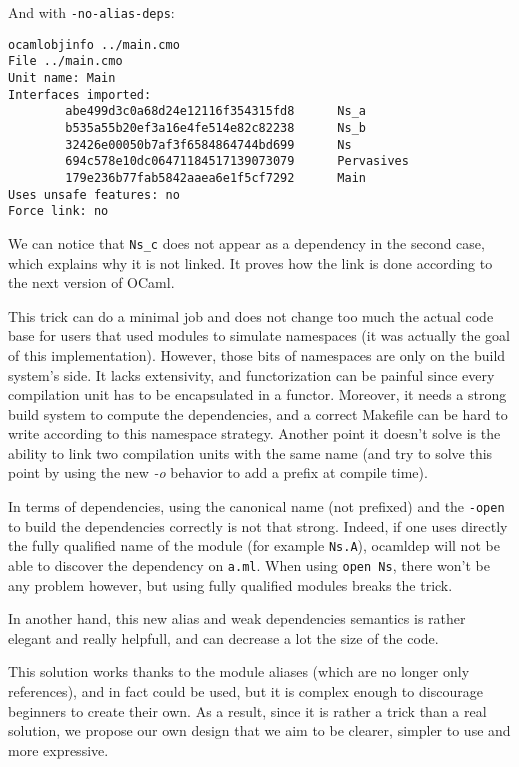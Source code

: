 \documentclass[11pt,a4paper]{article}
\begin{document}
And with \texttt{-no-alias-deps}:

\begin{verbatim}
ocamlobjinfo ../main.cmo
File ../main.cmo
Unit name: Main
Interfaces imported:
        abe499d3c0a68d24e12116f354315fd8      Ns_a
        b535a55b20ef3a16e4fe514e82c82238      Ns_b
        32426e00050b7af3f6584864744bd699      Ns
        694c578e10dc06471184517139073079      Pervasives
        179e236b77fab5842aaea6e1f5cf7292      Main
Uses unsafe features: no
Force link: no
\end{verbatim}

We can notice that \texttt{Ns\_c} does not appear as a dependency in the second
case, which explains why it is not linked. It proves how the link is done
according to the next version of OCaml.

This trick can do a minimal job and does not change too much the actual code
base for users that used modules to simulate namespaces (it was actually the
goal of this implementation). However, those bits of namespaces are only on the
build system's side. It lacks extensivity, and functorization can be painful
since every compilation unit has to be encapsulated in a functor. Moreover, it
needs a strong build system to compute the dependencies, and a correct Makefile
can be hard to write according to this namespace strategy. Another point it
doesn't solve is the ability to link two compilation units with the same name
(and try to solve this point by using the new \emph{-o} behavior to add a prefix
at compile time).

In terms of dependencies, using the canonical name (not prefixed) and the
\texttt{-open} to build the dependencies correctly is not that strong. Indeed,
if one uses directly the fully qualified name of the module (for example
\texttt{Ns.A}), ocamldep will not be able to discover the dependency on
\texttt{a.ml}. When using \lstinline{open Ns}, there won't be any problem
however, but using fully qualified modules breaks the trick. 

In another hand, this new alias and weak dependencies semantics is rather
elegant and really helpfull, and can decrease a lot the size of the code.

This solution works thanks to the module aliases (which are no longer only
references), and in fact could be used, but it is complex enough to discourage
beginners to create their own. As a result, since it is rather a trick than a
real solution, we propose our own design that we aim to be clearer, simpler to
use and more expressive.
\end{document}
